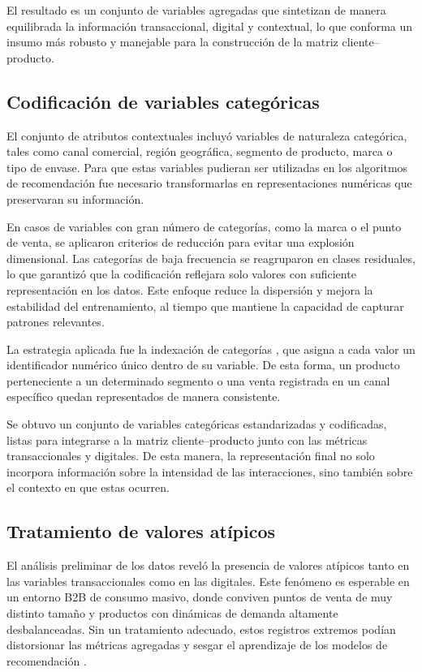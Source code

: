 El resultado es un conjunto de variables agregadas que sintetizan de manera equilibrada la información transaccional, digital y contextual, lo que conforma un insumo más robusto y manejable para la construcción de la matriz cliente–producto.

\subsection{Codificación de variables categóricas}

El conjunto de atributos contextuales incluyó variables de naturaleza categórica, tales como canal comercial, región geográfica, segmento de producto, marca o tipo de envase. Para que estas variables pudieran ser utilizadas en los algoritmos de recomendación fue necesario transformarlas en representaciones numéricas que preservaran su información.

En casos de variables con gran número de categorías, como la marca o el punto de venta, se aplicaron criterios de reducción para evitar una explosión dimensional. Las categorías de baja frecuencia se reagruparon en clases residuales, lo que garantizó que la codificación reflejara solo valores con suficiente representación en los datos. Este enfoque reduce la dispersión y mejora la estabilidad del entrenamiento, al tiempo que mantiene la capacidad de capturar patrones relevantes.

La estrategia aplicada fue la indexación de categorías \cite{BOOK:Ricci2015}, que asigna a cada valor un identificador numérico único dentro de su variable. De esta forma, un producto perteneciente a un determinado segmento o una venta registrada en un canal específico quedan representados de manera consistente.

Se obtuvo un conjunto de variables categóricas estandarizadas y codificadas, listas para integrarse a la matriz cliente–producto junto con las métricas transaccionales y digitales. De esta manera, la representación final no solo incorpora información sobre la intensidad de las interacciones, sino también sobre el contexto en que estas ocurren.

\subsection{Tratamiento de valores atípicos}

El análisis preliminar de los datos reveló la presencia de valores atípicos tanto en las variables transaccionales como en las digitales. Este fenómeno es esperable en un entorno B2B de consumo masivo, donde conviven puntos de venta de muy distinto tamaño y productos con dinámicas de demanda altamente desbalanceadas. Sin un tratamiento adecuado, estos registros extremos podían distorsionar las métricas agregadas y sesgar el aprendizaje de los modelos de recomendación \cite{BOOK:Aggarwal2015}.

